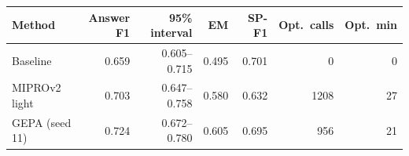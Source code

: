\begin{tabular}{lrrrrrr}
\hline
Method & Answer F1 & 95\% interval & EM & SP-F1 & Opt.\ calls & Opt.\ min \\ \hline
Baseline & 0.659 & 0.605--0.715 & 0.495 & 0.701 & 0 & 0 \\
MIPROv2 light & 0.703 & 0.647--0.758 & 0.580 & 0.632 & 1208 & 27 \\
GEPA (seed 11) & 0.724 & 0.672--0.780 & 0.605 & 0.695 & 956 & 21 \\
\hline
\end{tabular}
